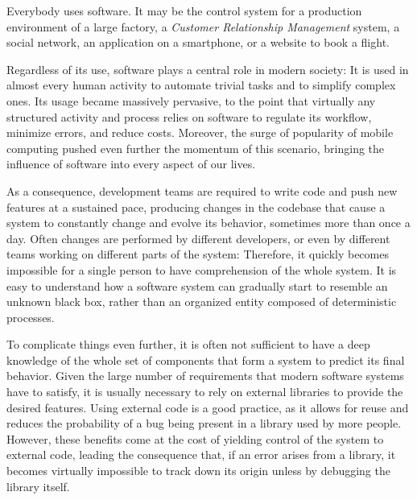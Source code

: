

Everybody uses software.
It may be the control system for a production environment of a large factory, a \emph{Customer Relationship Management} system, a social network, an application on a smartphone, or a website to book a flight.

Regardless of its use, software plays a central role in modern society: It is used in almost every human activity to automate trivial tasks and to simplify complex ones.
Its usage became massively pervasive, to the point that virtually any structured activity and process relies on software to regulate its workflow, minimize errors, and reduce costs.
Moreover, the surge of popularity of mobile computing pushed even further the momentum of this scenario, bringing the influence of software into every aspect of our lives.

As a consequence, development teams are required to write code and push new features at a sustained pace, producing changes in the codebase that cause a system to constantly change and evolve its behavior, sometimes more than once a day.
Often changes are performed by different developers, or even by different teams working on different parts of the system: Therefore, it quickly becomes impossible for a single person to have comprehension of the whole system.
It is easy to understand how a software system can gradually start to resemble an unknown black box, rather than an organized entity composed of deterministic processes.

To complicate things even further, it is often not sufficient to have a deep knowledge of the whole set of components that form a system to predict its final behavior.
Given the large number of requirements that modern software systems have to satisfy, it is usually necessary to rely on external libraries to provide the desired features.
Using external code is a good practice, as it allows for reuse and reduces the probability of a bug being present in a library used by more people.
However, these benefits come at the cost of yielding control of the system to external code, leading the consequence that, if an error arises from a library, it becomes virtually impossible to track down its origin unless by debugging the library itself.

